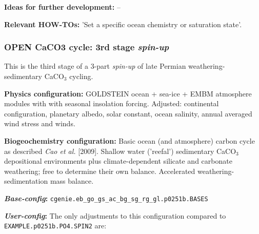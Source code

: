 \documentclass[10pt,twoside]{article}
\begin{document}
\noindent \textbf{Ideas for further development:} --

\noindent \textbf{Relevant HOW-TOs:} 'Set a specific ocean chemistry or saturation state'.


\subsubsection{OPEN CaCO3 cycle: 3rd stage \textit{spin-up}}\label{EXAMPLE.p0251b.PO4.SPIN2}

This is the third stage of a 3-part \textsl{spin-up} of late Permian weathering-sedimentary CaCO$_{3}$ cycling.

\noindent \textbf{Physics configuration:} GOLDSTEIN ocean + sea-ice + EMBM atmosphere modules with with seasonal insolation forcing. Adjusted: continental configuration, planetary albedo, solar constant, ocean salinity, annual averaged wind stress and winds.

\noindent \textbf{Biogeochemistry configuration:} Basic ocean (and atmosphere) carbon cycle as described \textit{Cao et al.} [2009]. Shallow water ('reefal') sedimentary CaCO$_{3}$ depositional environments plus climate-dependent silicate and carbonate weathering; free to determine their own balance. Accelerated weathering-sedimentation mass balance.

\noindent \textbf{\textit{Base-config}:} \texttt{cgenie.eb\_go\_gs\_ac\_bg\_sg\_rg\_gl.p0251b.BASES}

\noindent \textbf{\textit{User-config}:} The only adjustments to this configuration compared to \texttt{EXAMPLE.p0251b.PO4.SPIN2} are:
\end{document}
